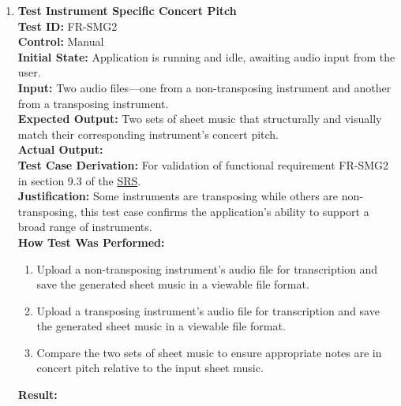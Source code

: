 \documentclass[12pt, titlepage]{article}
\begin{document}
\begin{enumerate}
  \item \textbf{Test Instrument Specific Concert Pitch} \\
    \newline
    \textbf{Test ID:} FR-SMG2 \\
    \textbf{Control:} Manual \\
    \textbf{Initial State:} Application is running and idle, awaiting audio input from the user. \\
    \textbf{Input:} Two audio files—one from a non-transposing instrument and another from a transposing instrument. \\
    \textbf{Expected Output:} Two sets of sheet music that structurally and visually match their corresponding instrument’s concert pitch. \\
    \textbf{Actual Output:} \\
    \textbf{Test Case Derivation:} For validation of functional requirement FR-SMG2 in section 9.3 of the 
    \href{https://github.com/emilyperica/ScoreGen/blob/main/docs/SRS-Volere/SRS.pdf}{SRS}. \\
    \textbf{Justification:} Some instruments are transposing while others are non-transposing, this test case confirms the application's 
    ability to support a broad range of instruments.\\
    \textbf{How Test Was Performed:}
    \begin{enumerate}
        \item Upload a non-transposing instrument’s audio file for transcription and save the generated sheet music in a 
        viewable file format.
        \item Upload a transposing instrument’s audio file for transcription and save the generated sheet music in a viewable 
        file format.
        \item Compare the two sets of sheet music to ensure appropriate notes are in concert pitch relative to the input sheet music.
    \end{enumerate}
    \textbf{Result:}
  

\end{enumerate}
\end{document}
